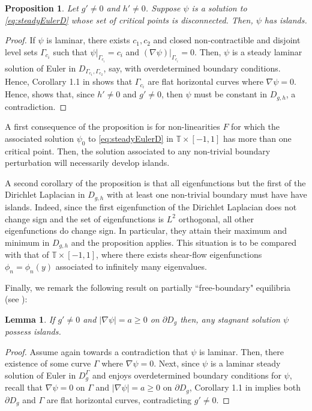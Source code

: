 \documentclass[11pt,reqno]{amsproc}
\newtheorem{proposition}{Proposition}[section]
\numberwithin{equation}{section}
\numberwithin{theorem}{section}
\numberwithin{prop}{section}
\numberwithin{cor}{section}
\newtheorem{lemma}{Lemma}
\numberwithin{lemma}{section}
\theoremstyle{remark}
\theoremstyle{definition}
\begin{document}
\begin{proposition}\label{prop:islandscritical}
Let $g'\neq 0$ and $h'\neq 0$. Suppose $\psi$ is a solution to \eqref{eq:steadyEulerD} whose set of critical points is disconnected. Then, $\psi$ has islands.
\end{proposition}

\begin{proof}
If $\psi$ is laminar, there exists $c_1,c_2$ and closed non-contractible and disjoint level sets $\Gamma_{c_i}$ such that  $\psi|_{\Gamma_{c_i}}=c_i$ and  $(\nabla\psi)|_{\Gamma_{c_i}}=0$. Then, $\psi$ is a steady laminar solution of Euler in $D_{\Gamma_{c_1},\Gamma_{c_2}}$, say, with overdetermined boundary conditions. Hence, Corollary 1.1 in \cite{drivas2024geometric} shows that $\Gamma_{c_i}$ are flat horizontal curves where $\nabla\psi = 0$. Hence, \cite[Lemma 3]{drivas2024islands} shows that, since $h'\neq 0$ and $g'\neq 0$, then $\psi$ must be constant in $D_{g,h}$, a contradiction.
\end{proof}

A first consequence of the proposition is for non-linearities $F$ for which the associated solution $\psi_0$ to \eqref{eq:steadyEulerD} in $\mathbb{T}\times[-1,1]$ has more than one critical point. Then, the solution associated to any non-trivial boundary perturbation will necessarily develop islands. 

A second corollary of the proposition is that all eigenfunctions but the first of the Dirichlet Laplacian in $D_{g,h}$ with at least one non-trivial boundary must have have islands. Indeed, since the first eigenfunction of the Dirichlet Laplacian does not change sign and the set of eigenfunctions is $L^2$ orthogonal, all other eigenfunctions do change sign. In particular, they attain their maximum and minimum in $D_{g,h}$ and the proposition applies. This situation is to be compared with that of $\mathbb{T}\times[-1,1]$, where there exists shear-flow eigenfunctions $\phi_n=\phi_n(y)$ associated to infinitely many eigenvalues.


Finally, we remark the following result on partially ``free-boundary"  equilibria (see \cite{CDG22}):
 \begin{lemma}\label{lemma:islandsingularbdry}
If $g'\neq 0$ and $|\nabla\psi| = a\geq 0$ on $\partial D_g$ then, any stagnant solution $\psi$ possess islands.
\end{lemma}
\begin{proof}
Assume again towards a contradiction that $\psi$ is laminar. Then, there existence of some curve $\Gamma$ where $\nabla\psi=0$. Next, since $\psi$ is a laminar steady solution of Euler in $D_g^\Gamma$ and enjoys overdetermined boundary conditions for $\psi$, recall that $\nabla\psi=0$ on $\Gamma$ and $|\nabla\psi|=a\geq 0$ on $\partial D_g$,  Corollary 1.1 in \cite{drivas2024geometric} implies both $\partial D_g$ and $\Gamma$ are flat horizontal curves, contradicting $g'\neq 0$.
\end{proof}
\end{document}
